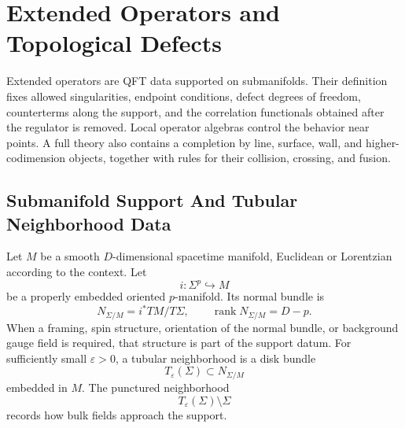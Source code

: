 \chapter{Extended Operators and Topological Defects}
\label{ch:extended-operators-topological-defects}

\ConventionsMixed

Extended operators are QFT data supported on submanifolds.  Their definition
fixes allowed singularities, endpoint conditions, defect degrees of freedom,
counterterms along the support, and the correlation functionals obtained after
the regulator is removed.  Local operator algebras control the behavior near
points.  A full theory also contains a completion by line, surface, wall, and
higher-codimension objects, together with rules for their collision, crossing,
and fusion.

\section{Submanifold Support And Tubular Neighborhood Data}

Let \(M\) be a smooth \(D\)-dimensional spacetime manifold, Euclidean or
Lorentzian according to the context.  Let
\[
  i:\Sigma^p\hookrightarrow M
\]
be a properly embedded oriented \(p\)-manifold.  Its normal bundle is
\[
  N_{\Sigma/M}=i^*TM/T\Sigma ,
  \qquad
  \operatorname{rank}N_{\Sigma/M}=D-p .
\]
When a framing, spin structure, orientation of the normal bundle, or
background gauge field is required, that structure is part of the support
datum.  For sufficiently small \(\varepsilon>0\), a tubular neighborhood is a
disk bundle
\[
  T_\varepsilon(\Sigma)\subset N_{\Sigma/M}
\]
embedded in \(M\).  The punctured neighborhood
\[
  T_\varepsilon(\Sigma)\setminus\Sigma
\]
records how bulk fields approach the support.

